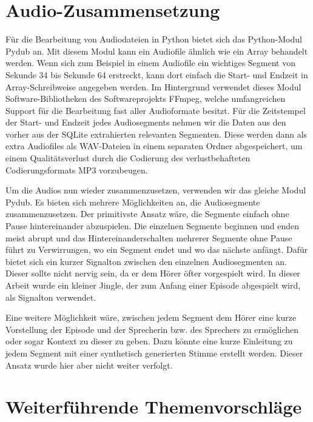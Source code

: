\section{Audio-Zusammensetzung}

Für die Bearbeitung von Audiodateien in Python bietet sich das Python-Modul Pydub an.
Mit diesem Modul kann ein Audiofile ähnlich wie ein Array behandelt werden.
Wenn sich zum Beispiel in einem Audiofile ein wichtiges Segment von Sekunde 34 bis Sekunde 64 erstreckt, kann dort einfach die Start- und Endzeit in Array-Schreibweise angegeben werden.
Im Hintergrund verwendet dieses Modul Software-Bibliotheken des Softwareprojekts FFmpeg, welche umfangreichen Support für die Bearbeitung fast aller Audioformate besitzt.\cite{ffmpeg}
Für die Zeitstempel der Start- und Endzeit jedes Audiosegments nehmen wir die Daten aus den vorher aus der SQLite extrahierten relevanten Segmenten.
Diese werden dann als extra Audiofiles als WAV-Dateien in einem separaten Ordner abgespeichert, um einem Qualitätsverlust durch die Codierung des verlustbehafteten Codierungsformats MP3 vorzubeugen.

Um die Audios nun wieder zusammenzusetzen, verwenden wir das gleiche Modul Pydub.
Es bieten sich mehrere Möglichkeiten an, die Audiosegmente zusammenzusetzen.
Der primitivste Ansatz wäre, die Segmente einfach ohne Pause hintereinander abzuspielen.
Die einzelnen Segmente beginnen und enden meist abrupt und das Hintereinanderschalten mehrerer Segmente ohne Pause führt zu Verwirrungen, wo ein Segment endet und wo das nächste anfängt.
Dafür bietet sich ein kurzer Signalton zwischen den einzelnen Audiosegmenten an.
Dieser sollte nicht nervig sein, da er dem Hörer öfter vorgespielt wird.
In dieser Arbeit wurde ein kleiner Jingle, der zum Anfang einer Episode abgespielt wird, als Signalton verwendet.

Eine weitere Möglichkeit wäre, zwischen jedem Segment dem Hörer eine kurze Vorstellung der Episode und der Sprecherin bzw. des Sprechers zu ermöglichen oder sogar Kontext zu dieser zu geben.
Dazu könnte eine kurze Einleitung zu jedem Segment mit einer synthetisch generierten Stimme erstellt werden.
Dieser Ansatz wurde hier aber nicht weiter verfolgt.

\section{Weiterführende Themenvorschläge}

